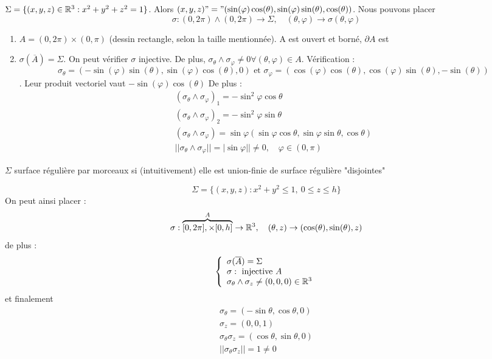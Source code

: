 \documentclass[12pt,a4paper]{article}
\begin{document}
 $\Sigma = \{(x,y,z) \in \mathbb{R}^3 : x^2 + y^2 + z^2 = 1\}$. Alors $(x,y,z) "=" (\sin(\varphi)\cos(\theta), \sin(\varphi)\sin(\theta), \cos(\theta))$. Nous pouvons placer \[\sigma : (0,2\pi) \wedge (0,2\pi) \to  \Sigma,\quad (\theta,\varphi) \to \sigma(\theta, \varphi)\]
\begin{enumerate}
	\item 	$A = (0,2\pi) \times (0,\pi)$ (dessin rectangle, selon la taille mentionnée). A est ouvert et borné, $\partial A$ est 
	\item 	$\sigma(\overline{A}) = \Sigma$. On peut vérifier $\sigma$ injective. De plus, $\sigma_\theta \wedge \sigma_\varphi \neq 0 \forall(\theta, \varphi) \in A$. Vérification : \[\sigma_\theta = (-\sin(\varphi)\sin(\theta), \sin(\varphi)\cos(\theta), 0)\text{ et }\sigma_\varphi= (\cos(\varphi)\cos(\theta), \cos(\varphi)\sin(\theta), -\sin(\theta))\]. Leur produit vectoriel vaut $-\sin(\varphi)\cos(\theta)$
			De plus :
			\begin{align*}
				(\sigma_\theta \wedge \sigma_\varphi)_1 = -\sin^2\varphi\cos\theta\\
				(\sigma_\theta \wedge \sigma_\varphi)_2 = -\sin^2\varphi\sin\theta\\
				(\sigma_\theta \wedge \sigma_\varphi) = \sin\varphi(\sin\varphi\cos\theta, \sin\varphi\sin\theta,\cos\theta)\\
				||\sigma_\theta \wedge \sigma_\varphi|| = |\sin \varphi|| \neq 0,\quad \varphi \in (0,\pi)
			\end{align*}
\end{enumerate}
\begin{boite}
	 $\Sigma$ surface régulière par morceaux si (intuitivement) elle est union-finie de surface régulière "disjointes"
\end{boite}
 \[\Sigma =  \{(x,y,z) : x^2 + y^2 \leq 1,\ 0\leq z \leq h\}\]
On peut ainsi placer :
\[\sigma : \overbrace{[0,2\pi], \times [0,h]}^A \to \mathbb{R}^3,\quad (\theta, z) \to (\cos(\theta),\sin(\theta),z)\]
de plus : \[\left\{\begin{array}{l}
\sigma(\overline{A}) = \Sigma\\
\sigma : \text{ injective } A\\
\sigma_\theta \wedge \sigma_z \neq (0,0,0) \in \mathbb{R}^3
\end{array}\right.\]
et finalement 
\begin{align*}
	\sigma_\theta = (-\sin\theta, \cos\theta, 0)\\
	\sigma_z = (0,0,1)\\
	\sigma_\theta \sigma_z = (\cos\theta, \sin\theta, 0)\\
	||\sigma_\theta \sigma_z|| = 1 \neq 0
\end{align*}
\end{document}
